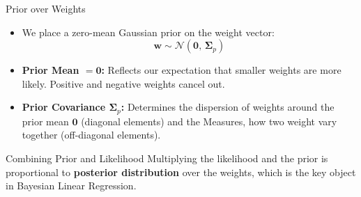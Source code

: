 \documentclass[aspectratio=169, 10pt,handout]{beamer}
\newcommand{\N}{\mathcal{N}}
\newcommand{\bw}{\mathbf{w}}
\newcommand{\bSigma}{\boldsymbol{\Sigma}}
\begin{document}
\begin{frame}{Prior over Weights}

  \begin{itemize}
    \item We place a zero-mean Gaussian prior on the weight vector:
      \[
        \bw \sim \N(\mathbf{0},\,\bSigma_p)
      \] 
    \item \textbf{Prior Mean $= \mathbf{0}$:} Reflects our expectation that
      smaller weights are more likely. Positive and negative weights cancel
      out.
    \item \textbf{Prior Covariance $\bSigma_p$:} Determines the dispersion of weights around the prior mean $\mathbf{0}$ (diagonal elements) and the Measures, how two weight vary together (off-diagonal elements).
  \end{itemize} 

  \vspace{4pt}
  \begin{block}{Combining Prior and Likelihood}
    Multiplying the likelihood and the prior is proportional to \textbf{posterior
    distribution} over the weights, which is the key object in Bayesian
    Linear Regression.
  \end{block}

\end{frame}

\end{document}
